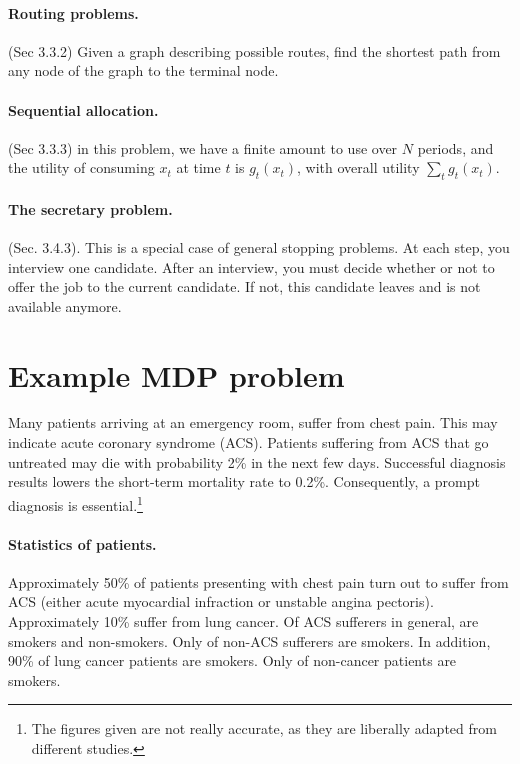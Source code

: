 \documentclass[twoside,a4paper]{article}
\begin{document}
  \paragraph{Routing problems.}  (Sec 3.3.2) Given a graph describing possible routes, find the shortest path from any node of the graph to the terminal node.
  \paragraph{Sequential allocation.} (Sec 3.3.3) in this problem, we have a finite amount to use over $N$ periods, and the utility of consuming $x_t$ at time $t$ is $g_t(x_t)$, with overall utility $\sum_t g_t(x_t)$. 
  \paragraph{The secretary problem.} (Sec. 3.4.3). This is a special case of general stopping problems. At each step, you interview one candidate. After an interview, you must decide whether or not to offer the job to the current candidate. If not, this candidate leaves and is not available anymore.  

\fi
\iffalse

\section{Example MDP problem}

Many patients arriving at an emergency room, suffer from chest pain. This may indicate acute coronary syndrome (ACS). Patients suffering from ACS that go untreated may die with probability 2\% in the next few days. Successful diagnosis results lowers the short-term mortality rate to 0.2\%. Consequently, a prompt diagnosis is essential.\footnote{The figures given are not really accurate, as they are liberally adapted from different studies.}

\paragraph{Statistics of patients.}
Approximately 50\% of patients presenting with chest pain turn out to suffer from ACS (either acute myocardial infraction or unstable angina pectoris). Approximately 10\% suffer from lung cancer. Of ACS sufferers in general,  are smokers and  non-smokers. Only  of non-ACS sufferers are smokers. In addition, 90\% of lung cancer patients are smokers.
Only  of non-cancer patients are smokers.
\end{document}
